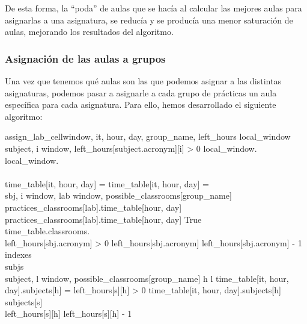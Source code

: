 De esta forma, la ``poda'' de aulas que se hacía al calcular las mejores aulas para asignarlas a una asignatura, se reducía y se producía una menor saturación de aulas, mejorando los resultados del algoritmo.

\subsubsection{Asignación de las aulas a grupos}

Una vez que tenemos qué aulas son las que podemos asignar a las distintas asignaturas, podemos pasar a asignarle a cada grupo de prácticas un aula específica para cada asignatura. Para ello, hemos desarrollado el siguiente algoritmo:

\begin{pseudocode}{assign\_lab\_cell}{window, it, hour, day, group\_name, left\_hours}
    \label{greedyaulas}
    local\_window \GETS []\\
    \FOREACH subject, i \in window,  \DO
    \BEGIN
        \IF left\_hours[subject.acronym][i] > 0 \DO
            local\_window.
        \ELSE 
            local\_window.\\
    \END\\

    \IF time\_table[it, hour, day] =  \DO
    \BEGIN
        time\_table[it, hour, day] = \\
        \FOREACH sbj, i \in window,  \DO
        \BEGIN
            \FOREACH lab \in window, possible\_classrooms[group\_name] \DO
            \BEGIN
                \IF \NOT practices\_classrooms[lab].time\_table[hour, day] \DO
                \BEGIN
                    practices\_classrooms[lab].time\_table[hour, day] \GETS True\\
                    time\_table.classrooms.\\
                    \IF left\_hours[sbj.acronym] > 0 \DO
                    \BEGIN
                        left\_hours[sbj.acronym] \GETS left\_hours[sbj.acronym] - 1\\
                    \END
                \END
            \END    
        \END
    \END
    \ELSE \DO
    \BEGIN
        indexes \GETS {}\\
        subjs \GETS {}\\
        \FOREACH subject, l \in window, possible\_classrooms[group\_name] \DO
        \BEGIN
            \FOREACH h \in l \DO
            \BEGIN
                \IF time\_table[it, hour, day].subjects[h] =  \AND left\_hours[s][h] > 0 \DO
                \BEGIN
                    time\_table[it, hour, day].subjects[h] \GETS subjects[s]\\
                    left\_hours[s][h] \GETS left\_hours[s][h] - 1 \\
                \END
            \END
        \END            
    \END
\end{pseudocode}

